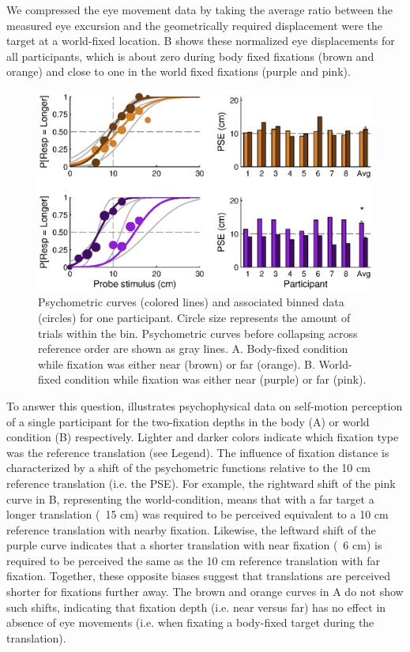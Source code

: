 We compressed the eye movement data by taking the average ratio between the measured eye excursion and the geometrically required displacement were the target at a world-fixed location. B shows these normalized eye displacements for all participants, which is about zero during body fixed fixations (brown and orange) and close to one in the world fixed fixations (purple and pink).  


\begin{figure}
    \includegraphics[width=1.0\textwidth]{src/paper4/paper4_figure3.eps}

	\caption{Psychometric curves (colored lines) and associated binned data (circles) for one participant. Circle size represents the amount of trials within the bin. Psychometric curves before collapsing across reference order are shown as gray lines. A.  Body-fixed condition while fixation was either near (brown) or far (orange). B. World-fixed condition while fixation was either near (purple) or far (pink).}
	\label{p4:fig3}
\end{figure}

To answer this question,  illustrates psychophysical data on self-motion perception of a single participant for the two-fixation depths in the body (A) or world condition (B) respectively. Lighter and darker colors indicate which fixation type was the reference translation (see Legend). The influence of fixation distance is characterized by a shift of the psychometric functions relative to the 10 \si{\centi\metre} reference translation (i.e. the PSE). For example, the rightward shift of the pink curve in B, representing the world-condition, means that with a far target a longer translation (~15 \si{\centi\metre}) was required to be perceived equivalent to a 10 \si{\centi\metre} reference translation with nearby fixation. Likewise, the leftward shift of the purple curve indicates that a shorter translation with near fixation (~6 \si{\centi\metre}) is required to be perceived the same as the 10 \si{\centi\metre} reference translation with far fixation. Together, these opposite biases suggest that translations are perceived shorter for fixations further away. The brown and orange curves in A do not show such shifts, indicating that fixation depth (i.e. near versus far) has no effect in absence of eye movements (i.e. when fixating a body-fixed target during the translation).

